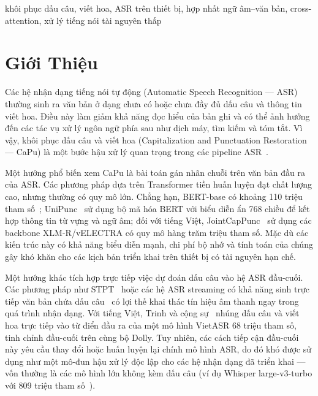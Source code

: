 \documentclass[conference,onecolumn]{IEEEtran}
\begin{document}
\begin{IEEEkeywords}
khôi phục dấu câu, viết hoa, ASR trên thiết bị, hợp nhất ngữ âm--văn bản,
cross-attention, xử lý tiếng nói tài nguyên thấp
\end{IEEEkeywords}

\section{Giới Thiệu}

Các hệ nhận dạng tiếng nói tự động (Automatic Speech Recognition --- ASR) thường
sinh ra văn bản ở dạng chưa có hoặc chưa đầy đủ dấu câu và thông tin viết hoa.
Điều này làm giảm khả năng đọc hiểu của bản ghi và có thể ảnh hưởng đến các tác
vụ xử lý ngôn ngữ phía sau như dịch máy, tìm kiếm và tóm tắt. Vì vậy, khôi phục
dấu câu và viết hoa (Capitalization and Punctuation Restoration --- CaPu) là một
bước hậu xử lý quan trọng trong các pipeline ASR~\cite{survey}.


Một hướng phổ biến xem CaPu là bài toán gán nhãn chuỗi trên văn bản đầu ra của
ASR. Các phương pháp dựa trên Transformer tiền huấn luyện đạt chất lượng cao,
nhưng thường có quy mô lớn. Chẳng hạn, BERT-base có khoảng 110 triệu tham
số~\cite{bertpunct}; UniPunc~\cite{unipunc} sử dụng bộ mã hóa BERT với biểu diễn
ẩn 768 chiều để kết hợp thông tin từ vựng và ngữ âm; đối với tiếng Việt,
JointCapPunc~\cite{jointcappunc} sử dụng các backbone XLM-R/vELECTRA có quy mô
hàng trăm triệu tham số. Mặc dù các kiến trúc này có khả năng biểu diễn mạnh,
chi phí bộ nhớ và tính toán của chúng gây khó khăn cho các kịch bản triển khai
trên thiết bị có tài nguyên hạn chế.

Một hướng khác tích hợp trực tiếp việc dự đoán dấu câu vào hệ ASR đầu-cuối.
Các phương pháp như STPT~\cite{stpt} hoặc các hệ ASR streaming có khả năng sinh
trực tiếp văn bản chứa dấu câu~\cite{kim2023} có lợi thế khai thác tín hiệu âm
thanh ngay trong quá trình nhận dạng. Với tiếng Việt, Trinh và cộng
sự~\cite{trinh2026} nhúng dấu câu và viết hoa trực tiếp vào từ điển đầu ra của một
mô hình VietASR 68 triệu tham số, tinh chỉnh đầu-cuối trên cùng bộ Dolly. Tuy nhiên,
các cách tiếp cận đầu-cuối này yêu cầu thay đổi hoặc huấn luyện lại chính mô hình
ASR, do đó khó được sử dụng như một mô-đun hậu xử lý độc lập cho các hệ nhận dạng
đã triển khai --- vốn thường là các mô hình lớn không kèm dấu câu (ví dụ Whisper
large-v3-turbo với 809 triệu tham số~\cite{whisper}).
\end{document}
